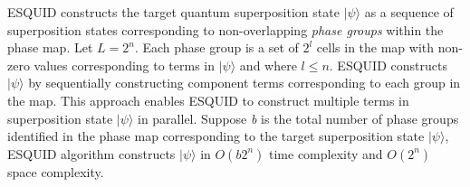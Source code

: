ESQUID constructs the target quantum superposition state $\vert \psi \rangle$ as a sequence of superposition states corresponding to non-overlapping \textit{phase groups} within the phase map. Let $L=2^n$. Each phase group is a set of $2^l$ cells in the map with non-zero values corresponding to terms in $\vert \psi \rangle$ and where $l \leq n$. ESQUID constructs $\vert \psi \rangle$ by sequentially constructing component terms corresponding to each group in the map. This approach enables ESQUID to construct multiple terms in superposition state $\vert \psi \rangle$ in parallel. Suppose \textit{b} is the total number of phase groups identified in the phase map corresponding to the target superposition state $\vert \psi \rangle$, ESQUID algorithm constructs $\vert \psi \rangle$ in $O(b2^n)$ time complexity and $O(2^n)$ space complexity.

